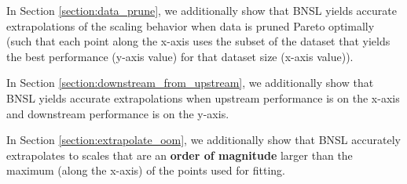 \documentclass{article} %
\begin{document}
\vspace{-2.1mm}

In Section \ref{section:data_prune}, we additionally show that BNSL yields accurate extrapolations of the scaling behavior when data is pruned Pareto optimally (such that each point along the x-axis uses the subset of the dataset that yields the best performance (y-axis value) for that dataset size (x-axis value)).

\vspace{-2.1mm}

In Section \ref{section:downstream_from_upstream}, we additionally show that BNSL yields accurate extrapolations when upstream performance is on the x-axis and downstream performance is on the y-axis.

\vspace{-2.1mm}

In Section \ref{section:extrapolate_oom}, we additionally show that BNSL accurately extrapolates to scales that are an \textbf{order of magnitude} larger than the maximum (along the x-axis) of the points used for fitting.


\iffalse
\end{document}
